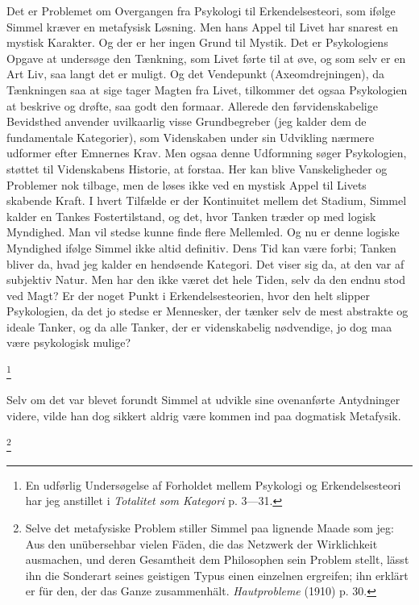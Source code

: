 \documentclass[12pt]{article}
\newcommand{\apage}[1]{\marginnote{\footnotesize\textit{[#1]}}}
\begin{document}
Det er Problemet om Overgangen fra Psykologi til Erkendelsesteori, som ifølge
Simmel kræver en metafysisk Løsning. Men hans Appel til
\guillemotright{}Livet\guillemotleft{} har snarest en mystisk Karakter. Og der
er her ingen Grund til Mystik. Det er Psykologiens Opgave at undersøge den
Tænkning, som Livet førte til at øve, og som selv er en Art Liv, saa langt det
er muligt. Og det Vendepunkt (\guillemotright{}Axeomdrejningen\guillemotleft{}),
\setcounter{footnote}{0}%
\apage{94}da Tænkningen saa at sige tager Magten fra Livet, tilkommer det ogsaa
Psykologien at beskrive og drøfte, saa godt den formaar. Allerede den
førvidenskabelige Bevidsthed anvender uvilkaarlig visse Grundbegreber (jeg
kalder dem de fundamentale Kategorier), som Videnskaben under sin Udvikling
nærmere udformer efter Emnernes Krav. Men ogsaa denne Udformning søger
Psykologien, støttet til Videnskabens Historie, at forstaa. Her kan blive
Vanskeligheder og Problemer nok tilbage, men de løses ikke ved en mystisk Appel
til Livets skabende Kraft. I hvert Tilfælde er der Kontinuitet mellem det
Stadium, Simmel kalder en Tankes Fostertilstand, og det, hvor Tanken træder op
med logisk Myndighed. Man vil stedse kunne finde flere Mellemled. Og nu er
denne logiske Myndighed ifølge Simmel ikke altid definitiv. Dens Tid kan være
forbi; Tanken bliver da, hvad jeg kalder en hendøende Kategori. Det viser sig
da, at den var af subjektiv Natur. Men har den ikke været det hele Tiden, selv
da den endnu stod ved Magt? Er der noget Punkt i Erkendelsesteorien, hvor den
helt slipper Psykologien, da det jo stedse er Mennesker, der tænker selv de
mest abstrakte og ideale Tanker, og da alle Tanker, der er videnskabelig
nødvendige, jo dog maa være psykologisk mulige?

         \footnote{En udførlig Undersøgelse af Forholdet mellem Psykologi og
Erkendelsesteori har jeg anstillet i \textit{Totalitet som Kategori} p. 3---31.}

Selv om det var blevet forundt Simmel at udvikle sine ovenanførte Antydninger
videre, vilde han dog sikkert aldrig være kommen ind paa dogmatisk Metafysik.

         \footnote{Selve det metafysiske Problem stiller Simmel paa lignende
Maade som jeg: \guillemotright{}Aus den unübersehbar vielen Fäden, die das
Netzwerk der Wirklichkeit ausmachen, und deren Gesamtheit dem Philosophen sein
Problem stellt, lässt ihn die Sonderart seines geistigen Typus einen einzelnen
ergreifen; ihn erklärt er für den, der das Ganze zusammenhält.\guillemotleft{}
\textit{Hautprobleme} (1910) p. 30.}
\end{document}
